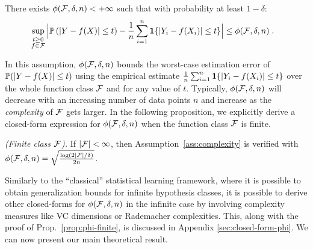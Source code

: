 \begin{assumption} \label{ass:complexity} There exists $\phi(\mathcal{F},\delta,n)<+\infty$ such that with probability at least $1-\delta$:
   \begin{align*}
       &\sup_{\overset{\scriptstyle t\geq 0}{f\in\mathcal{F}}}\Big|{\mathbb{P}}\left(|Y-f(X)|\leq t\right) - \frac{1}{n}\sum_{i=1}^n\mathbf{1}\{|Y_i-f(X_i)|\leq t\}\Big| \leq \phi(\mathcal{F},\delta,n) \; .
   \end{align*}
\end{assumption}
In this assumption, ${\phi(\mathcal{F},\delta,n)}$ bounds the worst-case estimation error of ${\mathbb{P}}(|Y-f(X)|\leq t)$ using the empirical estimate $\frac{1}{n}\sum_{i=1}^n\mathbf{1}\{|Y_i-f(X_i)|\leq t\}$ over the whole function class $\mathcal{F}$ and for any value of $t$. Typically, ${\phi(\mathcal{F},\delta,n)}$ will decrease with an increasing number of data points $n$ and increase as the \emph{complexity} of $\mathcal{F}$ gets larger. In the following proposition, we explicitly derive a closed-form expression for ${\phi(\mathcal{F},\delta,n)}$ when the function class $\mathcal{F}$ is finite. 
%
\begin{proposition}\emph{(Finite class $\mathcal{F}$).}
    \label{prop:phi-finite}
    If $|\mathcal{F}|<\infty$, then Assumption~\ref{ass:complexity} is verified with ${\phi(\mathcal{F},\delta,n)} = \sqrt{\frac{\log(2|\mathcal{F}|/\delta)}{2n}}$.
\end{proposition}
%
Similarly to the “classical” statistical learning framework, where it is possible to obtain generalization bounds for infinite hypothesis classes, it is possible to derive other closed-forms for ${\phi(\mathcal{F},\delta,n)}$ in the infinite case by involving complexity measures like VC dimensions or Rademacher complexities. This, along with the proof of Prop.~\ref{prop:phi-finite}, is discussed in Appendix \ref{sec:closed-form-phi}. We can now present our main theoretical result.

